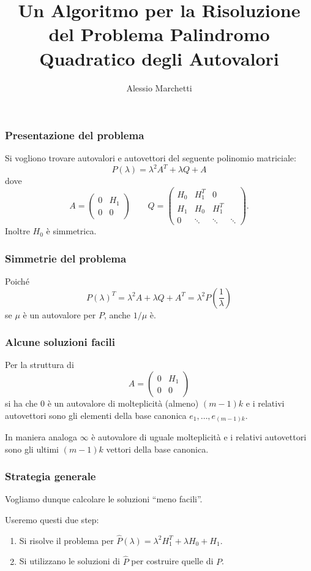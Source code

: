 \documentclass{beamer}
\title[Risoluzione di PQEP]{Un Algoritmo per la Risoluzione del Problema
Palindromo Quadratico degli Autovalori }
\author{Alessio Marchetti}
\date{}
\begin{document}
\frame{\titlepage}

\begin{frame}
\frametitle{Presentazione del problema}
    Si vogliono trovare autovalori e autovettori del seguente polinomio
    matriciale:
    \[
        P(\lambda) = \lambda^2 A^T + \lambda Q + A
    \]
    dove
    \[
        A = 
        \begin{pmatrix}
            0 & H_1 \\
            0 & 0
        \end{pmatrix}
        \qquad
        Q = 
        \begin{pmatrix}
            H_0 & H_1^T & 0\\
            H_1 & H_0 & H_1^T \\
            0 & \ddots & \ddots & \ddots 
        \end{pmatrix}.
    \]
    Inoltre $H_0$ \`e simmetrica.
\end{frame}



\begin{frame}
\frametitle{Simmetrie del problema}
    Poich\'e
    \[
        P(\lambda)^T = \lambda^2 A + \lambda Q + A^T = \lambda^2
        P\left(\frac{1}{\lambda}\right)
    \]
    se $\mu$ \`e un autovalore per $P$, anche $1/\mu$ \`e.
\end{frame}


\begin{frame}
\frametitle{Alcune soluzioni facili}
    Per la struttura di
    \[ %
        A = 
        \begin{pmatrix}
            0 & H_1 \\
            0 & 0
        \end{pmatrix}
    \]
    si ha che $0$ \`e un autovalore di molteplicit\`a (almeno) $(m-1)k$ e i
    relativi autovettori sono gli elementi della base canonica $e_1, \dots,
    e_{(m-1)k}$.

    In maniera analoga $\infty$ \`e autovalore di uguale molteplicit\`a e i
    relativi autovettori sono gli ultimi $(m-1)k$ vettori della base canonica.
\end{frame}


\begin{frame}
\frametitle{Strategia generale}
    Vogliamo dunque calcolare le soluzioni ``meno facili''.

    Useremo questi due step:
    \begin{enumerate}
        \item Si risolve il problema per $\hat{P}(\lambda) = \lambda^2 H_1^T +
            \lambda H_0 + H_1$.
        \item Si utilizzano le soluzioni di $\hat{P}$ per costruire quelle di
            $P$.
    \end{enumerate}
\end{frame}
\end{document}
